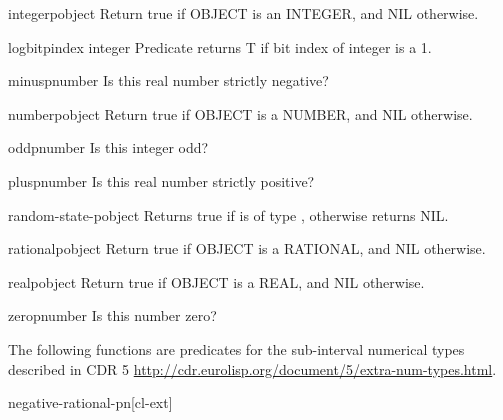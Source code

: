 \documentclass[10pt,english]{book}
\begin{document}
\begin{function}{integerp}{object}
  Return true if OBJECT is an INTEGER, and NIL otherwise.
\end{function}

\begin{function}{logbitp}{index integer}
  Predicate returns T if bit index of integer is a 1.
\end{function}

\begin{function}{minusp}{number}
  Is this real number strictly negative?
\end{function}

\begin{function}{numberp}{object}
  Return true if OBJECT is a NUMBER, and NIL otherwise.
\end{function}

\begin{function}{oddp}{number}
  Is this integer odd?
\end{function}

\begin{function}{plusp}{number}
  Is this real number strictly positive?
\end{function}

\begin{function}{random-state-p}{object}
  Returns true if  is of type ,
  otherwise returns NIL.
\end{function}

\begin{function}{rationalp}{object}
  Return true if OBJECT is a RATIONAL, and NIL otherwise.
\end{function}

\begin{function}{realp}{object}
  Return true if OBJECT is a REAL, and NIL otherwise.
\end{function}

\begin{function}{zerop}{number}
  Is this number zero?
\end{function}

The following functions are predicates for the sub-interval numerical
types described in CDR 5
\url{http://cdr.eurolisp.org/document/5/extra-num-types.html}.

\begin{function}{negative-rational-p}{n}[cl-ext]
  
\end{function}
\end{document}
